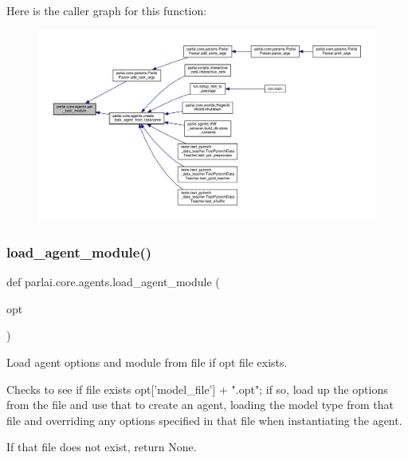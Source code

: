 Here is the caller graph for this function\+:
\nopagebreak
\begin{figure}[H]
\begin{center}
\leavevmode
\includegraphics[width=350pt]{namespaceparlai_1_1core_1_1agents_a530b987b67a802a8e9c5fa3c24ae942f_icgraph}
\end{center}
\end{figure}
\mbox{\label{namespaceparlai_1_1core_1_1agents_a213df46dd21144eb4c056bb58c294c5d}} 
\subsubsection{\texorpdfstring{load\+\_\+agent\+\_\+module()}{load\_agent\_module()}}
{\footnotesize\ttfamily def parlai.\+core.\+agents.\+load\+\_\+agent\+\_\+module (\begin{DoxyParamCaption}\item[{}]{opt }\end{DoxyParamCaption})}

\begin{DoxyVerb}Load agent options and module from file if opt file exists.

Checks to see if file exists opt['model_file'] + ".opt"; if so, load up the
options from the file and use that to create an agent, loading the model
type from that file and overriding any options specified in that file when
instantiating the agent.

If that file does not exist, return None.
\end{DoxyVerb}
 

